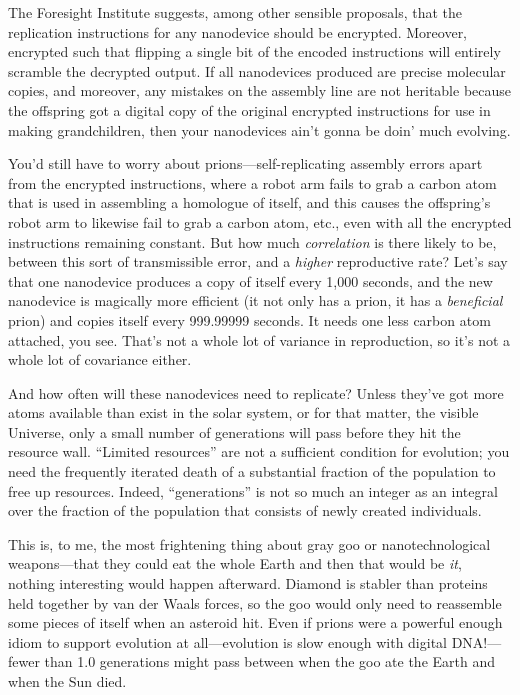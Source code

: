 {
 The Foresight Institute suggests, among other sensible proposals,
that the replication instructions for any nanodevice should be
encrypted. Moreover, encrypted such that flipping a single bit of the
encoded instructions will entirely scramble the decrypted output. If
all nanodevices produced are precise molecular copies, and moreover,
any mistakes on the assembly line are not heritable because the
offspring got a digital copy of the original encrypted instructions for
use in making grandchildren, then your nanodevices
ain't gonna be doin' much evolving.}

{
 You'd still have to worry about
prions---self-replicating assembly errors apart from the encrypted
instructions, where a robot arm fails to grab a carbon atom that is
used in assembling a homologue of itself, and this causes the
offspring's robot arm to likewise fail to grab a carbon
atom, etc., even with all the encrypted instructions remaining
constant. But how much \textit{correlation} is there likely to be,
between this sort of transmissible error, and a \textit{higher}
reproductive rate? Let's say that one nanodevice
produces a copy of itself every 1,000 seconds, and the new nanodevice
is magically more efficient (it not only has a prion, it has a
\textit{beneficial} prion) and copies itself every 999.99999 seconds.
It needs one less carbon atom attached, you see. That's
not a whole lot of variance in reproduction, so it's
not a whole lot of covariance either.}

{
 And how often will these nanodevices need to replicate? Unless
they've got more atoms available than exist in the
solar system, or for that matter, the visible Universe, only a small
number of generations will pass before they hit the resource wall.
``Limited resources'' are not a
sufficient condition for evolution; you need the frequently iterated
death of a substantial fraction of the population to free up resources.
Indeed, ``generations'' is not so
much an integer as an integral over the fraction of the population that
consists of newly created individuals.}

{
 This is, to me, the most frightening thing about gray goo or
nanotechnological weapons---that they could eat the whole Earth and
then that would be \textit{it}, nothing interesting would happen
afterward. Diamond is stabler than proteins held together by van der
Waals forces, so the goo would only need to reassemble some pieces of
itself when an asteroid hit. Even if prions were a powerful enough
idiom to support evolution at all---evolution is slow enough with
digital DNA!---fewer than 1.0 generations might pass between when the
goo ate the Earth and when the Sun died.}

